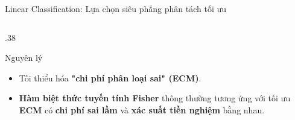 \begin{frame}[shrink=40]{Linear Classification: Lựa chọn siêu phẳng phân tách tối ưu}
\begin{columns}[T]
\begin{column}{.38\textwidth}
            \begin{alertblock}{Nguyên lý}
                \begin{itemize}
                    \item Tối thiểu hóa \textbf{"chi phí phân loại sai" (ECM)}.
                    \item \textbf{Hàm biệt thức tuyến tính Fisher} thông thường tương ứng với tối ưu \textbf{ECM} có \textbf{chi phí sai lầm} và \textbf{xác suất tiền nghiệm} bằng nhau.
                \end{itemize}
            \end{alertblock}
        \end{column}
    \end{columns}
\end{frame}

